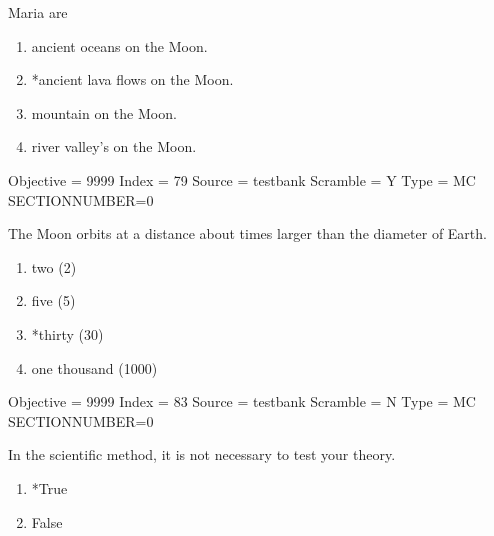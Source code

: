 \documentclass[11pt]{article}
\begin{document}
\begin{enumerate}
\begin{minipage}{\textwidth}
\begin{minipage}{\textwidth}
\item Maria are
\begin{multicols}{2}
\begin{enumerate} 
\setlength{\itemsep}{1pt} 
\setlength{\parskip}{0pt} 
\setlength{\parsep}{0pt}
\setlength{\multicolsep}{1pt} 
\item ancient oceans on the Moon.
\item *ancient lava flows on the Moon.
\item mountain on the Moon.
\item river valley's on the Moon.
\end{enumerate} 
\vfill 
\end{multicols}

Objective = 9999
Index = 79
Source = testbank
Scramble = Y
Type = MC
SECTIONNUMBER=0
\end{minipage}
\end{minipage}
\vskip 0.20in

\begin{minipage}{\textwidth}
\begin{minipage}{\textwidth}
\item The Moon orbits at a distance about \underline{\hspace{0.5in}} times larger than the diameter of Earth.
\begin{multicols}{3}
\begin{enumerate} 
\setlength{\itemsep}{1pt} 
\setlength{\parskip}{0pt} 
\setlength{\parsep}{0pt}
\setlength{\multicolsep}{1pt} 
\item two (2)
\item five (5)
\item *thirty (30)
\item one thousand (1000)
\end{enumerate} 
\vfill 
\end{multicols}

Objective = 9999
Index = 83
Source = testbank
Scramble = N
Type = MC
SECTIONNUMBER=0
\end{minipage}
\end{minipage}
\vskip 0.20in

\begin{minipage}{\textwidth}
\begin{minipage}{\textwidth}
\item In the scientific method, it is not necessary to test your theory.
\begin{multicols}{3}
\begin{enumerate} 
\setlength{\itemsep}{1pt} 
\setlength{\parskip}{0pt} 
\setlength{\parsep}{0pt}
\setlength{\multicolsep}{1pt} 
\item *True
\item False
\end{enumerate} 
\vfill 
\end{multicols}


\end{minipage}
\end{minipage}
\end{enumerate}
\end{document}
